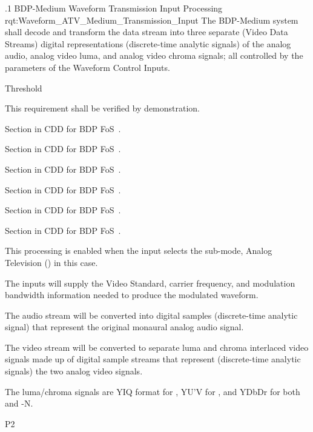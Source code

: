 \ONERQMTVKPP
{\RqtNumberBase.1}
{BDP-Medium \ATV Waveform Transmission Input Processing}
{rqt:Waveform_ATV_Medium_Transmission_Input}
{The BDP-Medium system shall decode and transform the \MPEGTS data stream into three separate (Video Data Streams) digital representations (discrete-time analytic signals) of the analog audio, analog video luma, and analog video chroma signals; all controlled by the parameters of the Waveform Control Inputs.}
{
	\item [Phase 1]  Threshold
}
{This requirement shall be verified by demonstration.}
{
	\item [5.1.1] Section in CDD for BDP FoS~\cite{ref__BDP_FOS_CDD}.
	\item [5.1.2] Section in CDD for BDP FoS~\cite{ref__BDP_FOS_CDD}.
	\item [5.5.1] Section in CDD for BDP FoS~\cite{ref__BDP_FOS_CDD}.
	\item [5.5.2] Section in CDD for BDP FoS~\cite{ref__BDP_FOS_CDD}.
	\item [5.5.3] Section in CDD for BDP FoS~\cite{ref__BDP_FOS_CDD}.
	\item [5.5.4] Section in CDD for BDP FoS~\cite{ref__BDP_FOS_CDD}.
}
{
	\item This processing is enabled when the input selects the sub-mode, Analog Television (\ATV) in this case.
	\item The inputs will supply the \ATV Video Standard, \RF carrier frequency, and modulation bandwidth information needed to produce the modulated \RF waveform.
	\item The audio stream will be converted into digital samples (discrete-time analytic signal) that represent the original monaural analog audio signal.
	\item The \MPEG video stream will be converted to separate luma and chroma interlaced video signals made up of digital sample streams that represent (discrete-time analytic signals) the two analog video signals.
	\item The luma/chroma signals are YIQ format for \NTSC, YU’V for \PAL, and YDbDr for both \SECAM and \PAL-N.
}
{P2}

